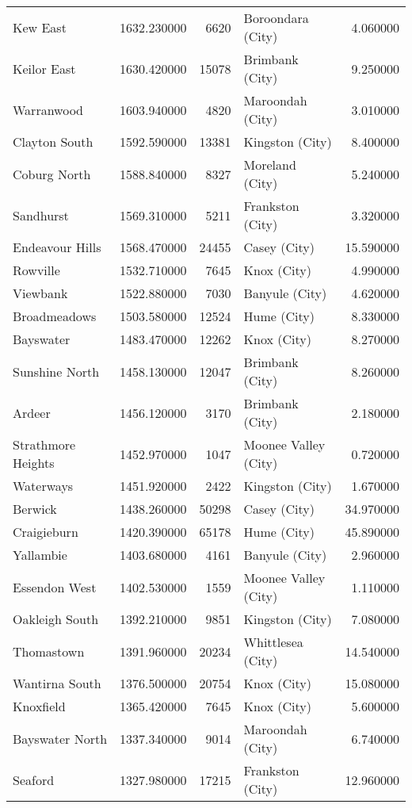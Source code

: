 \begin{table}
\begin{tabular}{lrrlr}
Kew East & 1632.230000 & 6620 & Boroondara (City) & 4.060000 \\
Keilor East & 1630.420000 & 15078 & Brimbank (City) & 9.250000 \\
Warranwood & 1603.940000 & 4820 & Maroondah (City) & 3.010000 \\
Clayton South & 1592.590000 & 13381 & Kingston (City) & 8.400000 \\
Coburg North & 1588.840000 & 8327 & Moreland (City) & 5.240000 \\
Sandhurst & 1569.310000 & 5211 & Frankston (City) & 3.320000 \\
Endeavour Hills & 1568.470000 & 24455 & Casey (City) & 15.590000 \\
Rowville & 1532.710000 & 7645 & Knox (City) & 4.990000 \\
Viewbank & 1522.880000 & 7030 & Banyule (City) & 4.620000 \\
Broadmeadows & 1503.580000 & 12524 & Hume (City) & 8.330000 \\
Bayswater & 1483.470000 & 12262 & Knox (City) & 8.270000 \\
Sunshine North & 1458.130000 & 12047 & Brimbank (City) & 8.260000 \\
Ardeer & 1456.120000 & 3170 & Brimbank (City) & 2.180000 \\
Strathmore Heights & 1452.970000 & 1047 & Moonee Valley (City) & 0.720000 \\
Waterways & 1451.920000 & 2422 & Kingston (City) & 1.670000 \\
Berwick & 1438.260000 & 50298 & Casey (City) & 34.970000 \\
Craigieburn & 1420.390000 & 65178 & Hume (City) & 45.890000 \\
Yallambie & 1403.680000 & 4161 & Banyule (City) & 2.960000 \\
Essendon West & 1402.530000 & 1559 & Moonee Valley (City) & 1.110000 \\
Oakleigh South & 1392.210000 & 9851 & Kingston (City) & 7.080000 \\
Thomastown & 1391.960000 & 20234 & Whittlesea (City) & 14.540000 \\
Wantirna South & 1376.500000 & 20754 & Knox (City) & 15.080000 \\
Knoxfield & 1365.420000 & 7645 & Knox (City) & 5.600000 \\
Bayswater North & 1337.340000 & 9014 & Maroondah (City) & 6.740000 \\
Seaford & 1327.980000 & 17215 & Frankston (City) & 12.960000 \\

\end{tabular}
\end{table}
